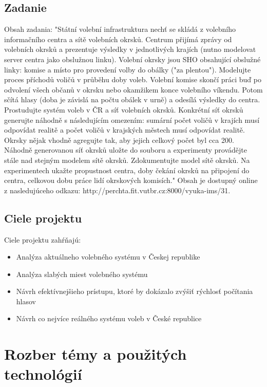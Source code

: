 \documentclass[12pt,a4paper,titlepage,final]{article}
\begin{document}
\subsection{Zadanie}
Obsah zadania: "Státní volební infrastruktura nechť se skládá z volebního informačního centra a sítě volebních okrsků. Centrum přijímá zprávy od volebních okrsků a prezentuje výsledky v jednotlivých krajích (nutno modelovat server centra jako obslužnou linku). Volební okrsky jsou SHO obsahující obslužné linky: komise a místo pro provedení volby do obálky ("za plentou"). Modelujte proces příchodů voličů v průběhu doby voleb. Volební komise skončí práci buď po odvolení všech občanů v okrsku nebo okamžikem konce volebního víkendu. Potom sčítá hlasy (doba je závislá na počtu obálek v urně) a odesílá výsledky do centra. Prostudujte systém voleb v ČR a síť volebních okrsků. Konkrétní síť okrsků generujte náhodně s následujícím omezením: sumární počet voličů v krajích musí odpovídat realitě a počet voličů v krajských městech musí odpovídat realitě. Okrsky nějak vhodně agregujte tak, aby jejich celkový počet byl cca 200. Náhodně generovanou síť okrsků uložte do souboru a experimenty provádějte stále nad stejným modelem sítě okrsků. Zdokumentujte model sítě okrsků. Na experimentech ukažte propustnost centra, doby čekání okrsků na připojení do centra, celkovou dobu práce lidí okrskových komisích."
Obsah je dostupný online z nasledujúceho odkazu: http://perchta.fit.vutbr.cz:8000/vyuka-ims/31.\cite{Prokop:Algoritmy}



\subsection{Ciele projektu}
Ciele projektu zahŕňajú:
\begin{itemize}
\item Analýza aktuálneho volebného systému v Českej republike
\item Analýza slabých miest volebného systému
\item Návrh efektívnejšieho prístupu, ktoré by dokázalo zvýšiť rýchlosť počítania hlasov
\item Návrh co nejvíce reálného systému voleb v České republice 
\end{itemize}


\section{Rozber témy a použitých technológií}
\end{document}
